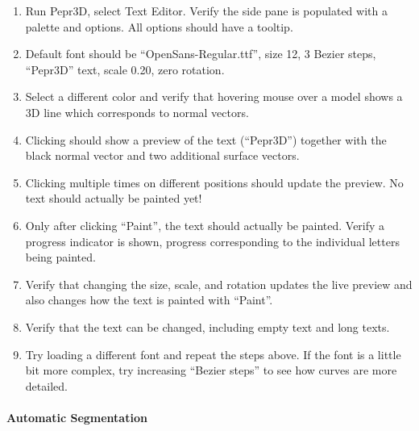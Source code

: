 \begin{enumerate}
\item Run Pepr3D, select Text Editor. Verify the side pane is populated with a palette and options. All options should have a tooltip.
\item Default font should be ``OpenSans-Regular.ttf'', size 12, 3 Bezier steps, ``Pepr3D'' text, scale 0.20, zero rotation.
\item Select a different color and verify that hovering mouse over a model shows a 3D line which corresponds to normal vectors.
\item Clicking should show a preview of the text (``Pepr3D'') together with the black normal vector and two additional surface vectors.
\item Clicking multiple times on different positions should update the preview. No text should actually be painted yet!
\item Only after clicking ``Paint'', the text should actually be painted. Verify a progress indicator is shown, progress corresponding to the individual letters being painted.
\item Verify that changing the size, scale, and rotation updates the live preview and also changes how the text is painted with ``Paint''.
\item Verify that the text can be changed, including empty text and long texts.
\item Try loading a different font and repeat the steps above. If the font is a little bit more complex, try increasing ``Bezier steps'' to see how curves are more detailed.
\end{enumerate}

\paragraph{Automatic Segmentation}

